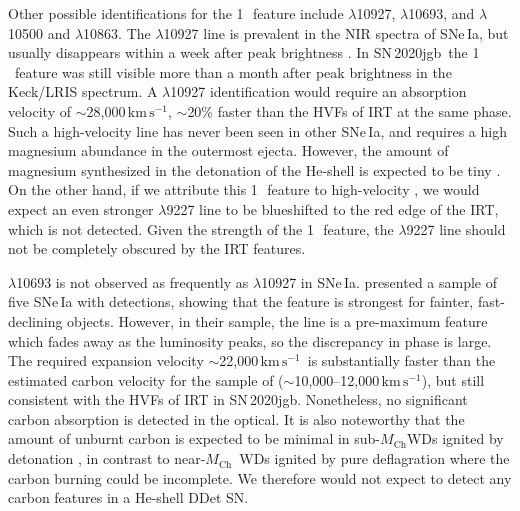 \documentclass[twocolumn]{aastex631}
\newcommand{\sn}{SN\,2020jgb}
\newcommand{\Mch}{$M_\mathrm{Ch}$}
\newcommand{\kms}{$\mathrm{km}\,\mathrm{s}^{-1}$}
\begin{document}
Other possible identifications for the 1\,\micron\ feature include  $\lambda$10927,  $\lambda$10693, and  $\lambda$10500 and $\lambda$10863. The  $\lambda$10927 line is prevalent in the NIR spectra of SNe\,Ia, but usually disappears within a week after peak brightness \citep{Marion2009_NIR}. In \sn\ the 1\,\micron\ feature was still visible more than a month after peak brightness in the Keck/LRIS spectrum. A  $\lambda$10927 identification would require an absorption velocity of $\sim$28,000\,\kms, $\sim$20\% faster than the HVFs of  IRT at the same phase. Such a high-velocity  line has never been seen in other SNe\,Ia, and requires a high magnesium abundance in the outermost ejecta. However, the amount of magnesium synthesized in the detonation of the He-shell is expected to be tiny \citep{Fink_DD_2010,Kromer_DD_2010,polin_observational_2019,polin_nebular_2021}. On the other hand, if we attribute this 1\,\micron\ feature to high-velocity , we would expect an even stronger  $\lambda$9227 line to be blueshifted to the red edge of the  IRT, which is not detected. Given the strength of the 1\,\micron\ feature, the  $\lambda$9227 line should not be completely obscured by the  IRT features.

 $\lambda$10693 is not observed as frequently as  $\lambda$10927 in SNe\,Ia. \citet{Hsiao_CSP_2019} presented a sample of five SNe\,Ia with  detections, showing that the  feature is strongest for fainter, fast-declining objects. However, in their sample, the  line is a pre-maximum feature which fades away as the luminosity peaks, so the discrepancy in phase is large. The required expansion velocity $\sim$22,000\,\kms\ is substantially faster than the estimated carbon velocity for the sample of \citet{Hsiao_CSP_2019} ($\sim$10,000--12,000\,\kms), but still consistent with the HVFs of  IRT in \sn. Nonetheless, no significant carbon absorption is detected in the optical. It is also noteworthy that the amount of unburnt carbon is expected to be minimal in sub-\Mch WDs ignited by detonation \citep{polin_observational_2019}, in contrast to near-\Mch\ WDs ignited by pure deflagration where the carbon burning could be incomplete. We therefore would not expect to detect any carbon features in a He-shell DDet SN.
\end{document}
